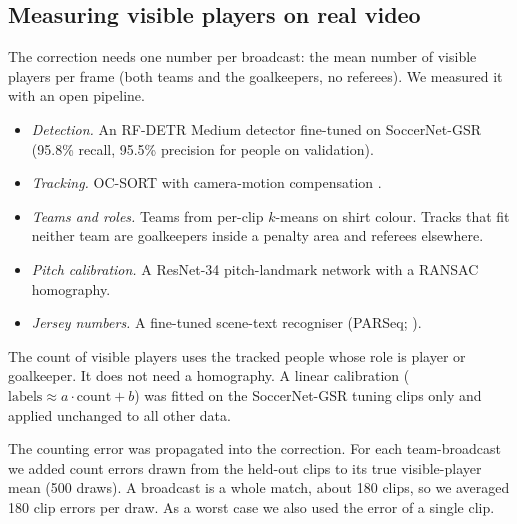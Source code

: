 \documentclass[]{interact}
\begin{document}
\subsection{Measuring visible players on real video}
The correction needs one number per broadcast: the mean number of visible players per frame (both teams and the
goalkeepers, no referees). We measured it with an open pipeline.
\begin{itemize}
\item \emph{Detection.} An RF-DETR Medium detector \citep{rfdetr} fine-tuned on SoccerNet-GSR (95.8\% recall, 95.5\%
precision for people on validation).
\item \emph{Tracking.} OC-SORT \citep{cao2023ocsort} with camera-motion compensation \citep{trackers}.
\item \emph{Teams and roles.} Teams from per-clip $k$-means on shirt colour. Tracks that fit neither team are
goalkeepers inside a penalty area and referees elsewhere.
\item \emph{Pitch calibration.} A ResNet-34 \citep{he2016resnet} pitch-landmark network with a RANSAC homography.
\item \emph{Jersey numbers.} A fine-tuned scene-text recogniser (PARSeq; \citealp{bautista2022parseq}).
\end{itemize}
The count of visible players uses the tracked people whose role is player or goalkeeper. It does not need a
homography. A linear calibration ($\text{labels} \approx a\cdot\text{count} + b$) was fitted on the SoccerNet-GSR
tuning clips only and applied unchanged to all other data.

The counting error was propagated into the correction. For each team-broadcast we added count errors drawn from the
held-out clips to its true visible-player mean (500 draws). A broadcast is a whole match, about 180 clips, so we
averaged 180 clip errors per draw. As a worst case we also used the error of a single clip.
\end{document}
